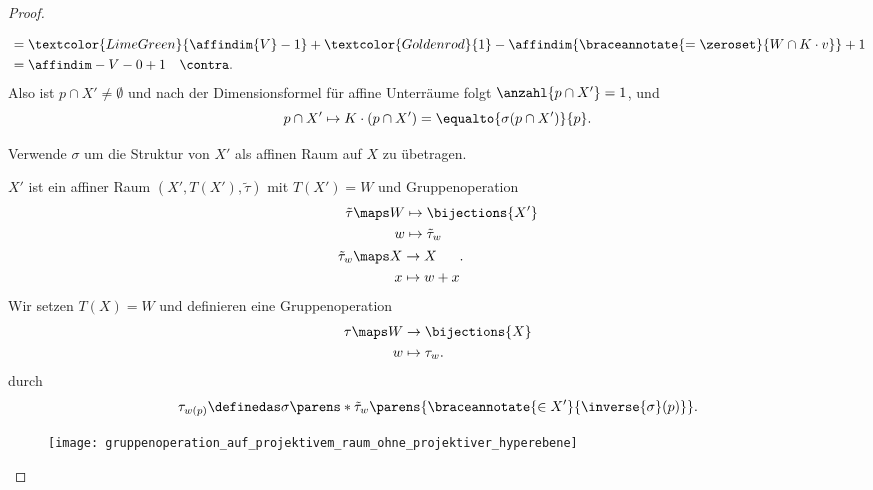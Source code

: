 \begin{proof}
\begin{proofdescription}
\begin{proofdescription}
\begin{align*}
        &=\textcolor{LimeGreen}{\affindim{V}-1}+\textcolor{Goldenrod}{1}-\affindim{\braceannotate{=\zeroset}{W\cap K\cdot v}}+1\\
        &=\affindim-{V}-0+1\quad \contra.
      \end{align*}
      Also ist \( p\cap X'\neq \emptyset \) und nach der Dimensionsformel für affine Unterräume folgt \( \anzahl{p\cap X'}=1 \), und
      \begin{equation*}
        p\cap X'\mapsto K\cdot(p\cap X')=\equalto{\sigma(p\cap X')}{p}.
      \end{equation*}
    \end{proofdescription}
    \begin{idee*}
      Verwende \( \sigma \) um die Struktur von \( X' \) als affinen Raum auf \( X \) zu übetragen.
    \end{idee*}
    \( X' \) ist ein affiner Raum \( (X',T(X'),\tilde{\tau}) \) mit \( T(X')=W \) und Gruppenoperation
    \begin{align*}
      \tilde{\tau}&\maps \begin{aligned}[t]
        W&\mapsto  \bijections{X'}\\
        w&\mapsto \tilde{\tau}_w
      \end{aligned}\\
      \tilde{\tau}_w&\maps \begin{aligned}[t]
        X&\to X\\
        x&\mapsto w+x
      \end{aligned}.
    \end{align*}
    Wir setzen \( T(X)=W \) und definieren eine Gruppenoperation
    \begin{equation*}
      \begin{split}
        \tau\maps W&\to \bijections{X}\\
        w&\mapsto \tau_w.
      \end{split}
    \end{equation*}
    durch
    \begin{equation*}
      \tau_{w(p)}\definedas \sigma\parens*{\tilde{\tau}_w\parens{\braceannotate{\in X'}{\inverse{\sigma}(p)}}}.
    \end{equation*}
    \begin{figure}[H]
      \centering
      \texttt{[image: gruppenoperation\_auf\_projektivem\_raum\_ohne\_projektiver\_hyperebene]}
      \label{fig:gruppenoperation_auf_projektivem_raum_ohne_projektiver_hyperebene}
    \end{figure}

\end{proofdescription}
\end{proof}
